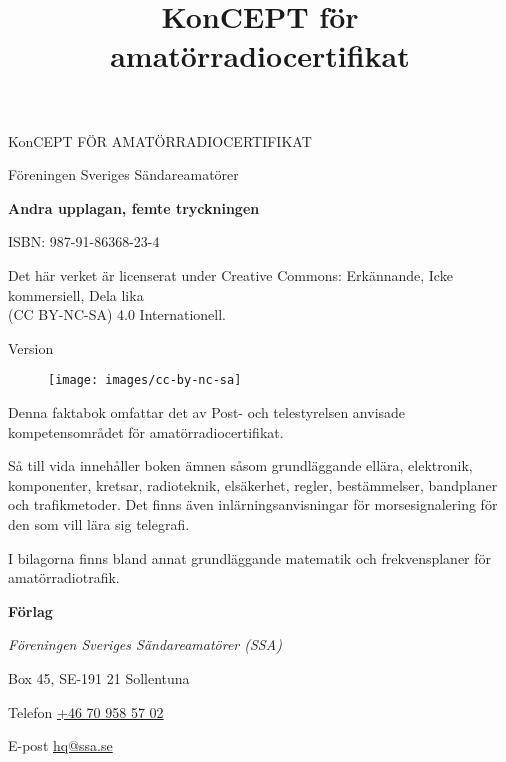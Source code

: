 \onecolumn{}
\vspace{10em}
\title{KonCEPT för amatörradiocertifikat}
\begin{center}
\Large{KonCEPT FÖR AMATÖRRADIOCERTIFIKAT}

Föreningen Sveriges Sändareamatörer\\[2\baselineskip]
\end{center}

\noindent \textbf{Andra upplagan, femte tryckningen}

\noindent ISBN: 987-91-86368-23-4

\noindent
\medskip
\noindent Det här verket är licenserat under Creative Commons:\newline
\noindent Erkännande, Icke kommersiell, Dela lika\\
\noindent (CC BY-NC-SA) 4.0 Internationell.\\
\bigskip

\noindent Version \revision

\begin{figure}[h]
    \texttt{[image: images/cc-by-nc-sa]}
\end{figure}


\vfill

\noindent Denna faktabok omfattar det av Post- och tele\-styrel\-sen anvisade
kompetensområdet för amatörradiocertifikat.

\bigskip

\noindent Så till vida innehåller boken ämnen såsom grundläggande ellära, elektronik, komponenter,
kretsar, radioteknik, elsäkerhet, regler, bestämmelser, bandplaner och tra\-fik\-metoder.
Det finns även inlärningsanvisningar för morsesignalering för den
som vill lära sig telegrafi.

\bigskip

\noindent I bilagorna finns bland annat grundläggande matematik
och frekvensplaner för ama\-törradiotrafik. 

\vfill

\noindent \textbf{Förlag}

\smallskip

\noindent\textit{Föreningen Sveriges Sändareamatörer (SSA)}

\smallskip\noindent Box 45, SE-191 21 Sollentuna

\smallskip

\noindent Telefon \href{tel:+46709585702}{+46 70 958 57 02}


\smallskip\noindent E-post \href{mailto:hq@ssa.se}{hq@ssa.se}


\restoregeometry\twocolumn
{}
